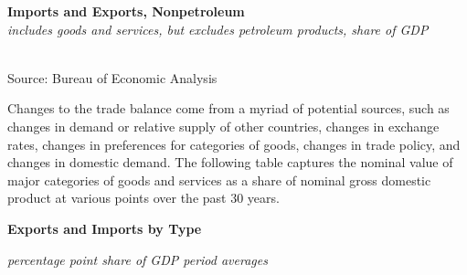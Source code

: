 \documentclass{report}
\makeatletter
\newcommand{\tbllink}[1]{\href{https://raw.githubusercontent.com/bdecon/US-chartbook/master/chartbook/data/#1}{\faTable}}
\newcommand*\short[1]{\expandafter\@gobbletwo\number\numexpr#1\relax}
\newcommand{\dateaxisticks}{
		date coordinates in=x, axis line style={draw=none},
		xmax={2020-02-01},
		max space between ticks=40,	    
		xtick={{1990-01-01}, {1992-01-01}, {1994-01-01}, 
			{1996-01-01}, {1998-01-01}, {2000-01-01}, 
			{2002-01-01}, {2004-01-01}, {2006-01-01},
			{2008-01-01}, {2010-01-01}, {2012-01-01}, {2014-01-01},
		    {2016-01-01}, {2018-01-01}, {2020-01-01}},
		minor xtick={{1989-01-01}, {1991-01-01}, {1993-01-01},
			{1995-01-01}, {1997-01-01}, {1999-01-01}, 
			{2001-01-01}, {2003-01-01}, {2005-01-01}, {2007-01-01},
		    {2009-01-01}, {2011-01-01}, {2013-01-01}, {2015-01-01},
		    {2017-01-01}, {2019-01-01}},
		enlarge y limits={0.06}, enlarge x limits={0.01},
		}
\newcommand{\bbar}[2]{extra #1 ticks = {{#2}}, extra #1 tick labels = ,
		extra #1 tick style = {grid=major, grid style={thick, black!25}},}
\newcommand{\thickline}[4]{\addplot[ultra thick, no markers, color=#1] 
		table [x=#2, y=#3, col sep=comma] {#4};	}
\newcommand{\rbars}{
		\fill[color=black!10] (axis cs:{1990-07-01},\pgfkeysvalueof{/pgfplots/ymin}) rectangle 
			(axis cs:{1991-03-01}, \pgfkeysvalueof{/pgfplots/ymax});
		\fill[color=black!10] (axis cs:{2007-12-01},\pgfkeysvalueof{/pgfplots/ymin}) rectangle 
			(axis cs:{2009-07-01}, \pgfkeysvalueof{/pgfplots/ymax});
		\fill[color=black!10] (axis cs:{2001-03-01},\pgfkeysvalueof{/pgfplots/ymin}) rectangle 
			(axis cs:{2001-11-01}, \pgfkeysvalueof{/pgfplots/ymax});}
\makeatother
\begin{document}
{{{{\begin{minipage}{0.76\textwidth}
\noindent \normalsize \textbf{Imports and Exports, Nonpetroleum}\\
\footnotesize{\textit{includes goods and services, but excludes petroleum products, share of GDP}}\\
\noindent \hspace*{-2mm} \\
\footnotesize{Source: Bureau of Economic Analysis} \hfill \tbllink{eximgdp.csv}


\end{minipage}

\newpage


\begin{minipage}{0.76\textwidth}

\small Changes to the trade balance come from a myriad of potential sources, such as changes in demand or relative supply of other countries, changes in exchange rates, changes in preferences for categories of goods, changes in trade policy, and changes in domestic demand. The following table captures the nominal value of major categories of goods and services as a share of nominal gross domestic product at various points over the past 30 years.  \\

\end{minipage}

\noindent \normalsize \textbf{Exports and Imports by Type}\\
\footnotesize{\textit{percentage point share of GDP \hspace{40mm} period averages}\\ 
\noindent {} \setlength{\tabcolsep}{3.1pt} \color{black!90}
		{\renewcommand{\arraystretch}{1.55}
		 \begin{tabular}{p{42mm} R{7.1mm} R{7.1mm} R{7.1mm} R{7.1mm} R{7.1mm} 
		   R{7.1mm} R{7.1mm} R{7.1mm} }
			 \hline
		\end{tabular}}	\\
		
}}}}}
\end{document}
